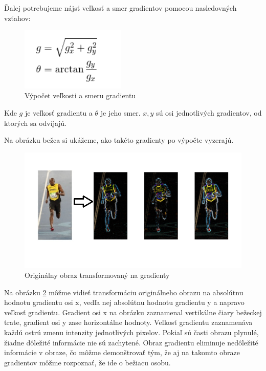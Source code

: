 Ďalej potrebujeme nájsť veľkosť a smer gradientov pomocou nasledovných vzťahov:

\begin{figure}[H]
  \centering
  \includegraphics[width=5cm]{img/HOGfunc.png}
  \caption{Výpočet veľkosti a smeru gradientu \cite{c20}}
  \label{HOGfunc}
\end{figure}

Kde $g$ je veľkosť gradientu a  $\theta$ je jeho smer.  $x,y$ sú osi jednotlivých gradientov, od ktorých sa odvíjajú. 

Na obrázku bežca si ukážeme, ako takéto gradienty po výpočte vyzerajú.

\begin{figure}[H]
  \centering
  \includegraphics[width=16cm]{img/HOGboltg.png}
  \caption{Originálny obraz transformovaný na gradienty \cite{c20}}
  \label{HOGbolt}
\end{figure}

Na obrázku \ref{HOGbolt} môžme vidieť transformáciu originálneho obrazu na absolútnu hodnotu gradientu osi x, vedľa nej absolútnu hodnotu gradientu y a napravo veľkosť gradientu.
Gradient osi x na obrázku zaznamenal vertikálne čiary bežeckej trate, gradient osi y zase horizontálne hodnoty. Veľkosť gradientu zaznamenáva každú ostrú zmenu intenzity jednotlivých pixelov. Pokiaľ sú časti obrazu plynulé, žiadne dôležité informácie nie sú zachytené. 
Obraz gradientu eliminuje nedôležité informácie v obraze, čo môžme demonštrovať tým, že aj na takomto obraze gradientov môžme rozpoznať, že ide o bežiacu osobu.

